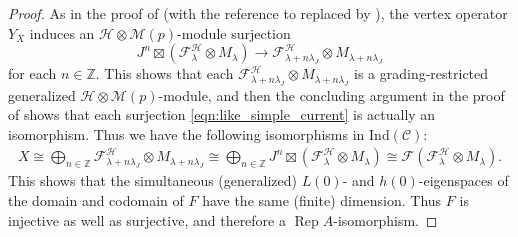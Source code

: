 \documentclass[11pt, reqno]{amsart}
\theoremstyle{definition}\newtheorem{defi}[thm]{Definition}
\theoremstyle{definition}\newtheorem{rem}[thm]{Remark}
\theoremstyle{definition}\newtheorem{exam}[thm]{Example}
\theoremstyle{definition}\newtheorem{assum}[thm]{Assumption}
\newcommand{\cH}{\mathcal{H}}
\newcommand{\cM}{\mathcal{M}}
\newcommand{\cF}{\mathcal{F}}
\newcommand{\cC}{\mathcal{C}}
\newcommand{\ZZ}{\mathbb{Z}}
\newcommand{\tens}{\boxtimes}
\newcommand{\ind}{\mathrm{Ind}}
\DeclareMathOperator{\rep}{Rep}
\newcommand{\repA}{\rep A}
\begin{document}
\begin{proof}
 As in the proof of \cite[Proposition 3.7]{CKLR} (with the reference to \cite[Proposition 4.5.6]{LL} replaced by \cite[Lemma 3.74]{CKM-exts}), the vertex operator $Y_X$ induces an $\cH\otimes\cM(p)$-module surjection
 \begin{equation}\label{eqn:like_simple_current}
 J^n\tens(\cF^\cH_\lambda\otimes M_\lambda)\longrightarrow\cF^\cH_{\lambda+n\lambda_J}\otimes M_{\lambda+n\lambda_J}
 \end{equation}
 for each $n\in\ZZ$. This shows that each $\cF^\cH_{\lambda+n\lambda_J}\otimes M_{\lambda+n\lambda_J}$ is a grading-restricted generalized $\cH\otimes\cM(p)$-module, and then the concluding argument in the proof of \cite[Proposition 3.7]{CKLR} shows that each surjection \eqref{eqn:like_simple_current} is actually an isomorphism. Thus we have the following isomorphisms in $\ind(\cC)$:
\begin{align*}
X \cong\bigoplus_{n\in\ZZ} \cF^\cH_{\lambda+n\lambda_J}\otimes M_{\lambda+n\lambda_J}\cong\bigoplus_{n\in\ZZ} J^n\tens(\cF^\cH_\lambda\otimes M_\lambda)\cong\cF(\cF^\cH_\lambda\otimes M_\lambda).
\end{align*}
This shows that the simultaneous (generalized) $L(0)$- and $h(0)$-eigenspaces of the domain and codomain of $F$ have the same (finite) dimension. Thus $F$ is injective as well as surjective, and therefore a $\repA$-isomorphism.
\end{proof}
\end{document}
